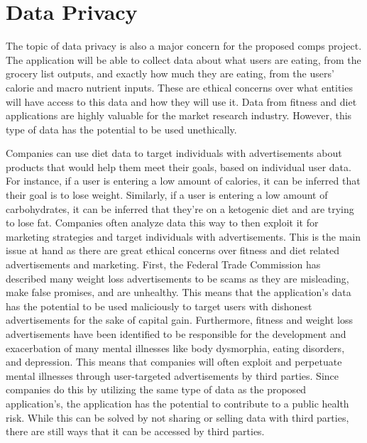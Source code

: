 \documentclass[10pt,twocolumn]{article}
\begin{document}
\section{Data Privacy}
The topic of data privacy is also a major concern for the proposed comps project. The application will be able to collect data about what users are eating, from the grocery list outputs, and exactly how much they are eating, from the users’ calorie and macro nutrient inputs. These are ethical concerns over what entities will have access to this data and how they will use it. Data from fitness and diet applications are highly valuable for the market research industry. However, this type of data has the potential to be used unethically. 

Companies can use diet data to target individuals with advertisements about products that would help them meet their goals, based on individual user data. For instance, if a user is entering a low amount of calories, it can be inferred that their goal is to lose weight. Similarly, if a user is entering a low amount of carbohydrates, it can be inferred that they’re on a ketogenic diet and are trying to lose fat. Companies often analyze data this way to then exploit it for marketing strategies and target individuals with advertisements.\cite{privacy_international_2021} This is the main issue at hand as there are great ethical concerns over fitness and diet related advertisements and marketing. First, the Federal Trade Commission has described many weight loss advertisements to be scams as they are misleading, make false promises, and are unhealthy.\cite{hebert_hernandez_perkins_puig_2022} This means that the application’s data has the potential to be used maliciously to target users with dishonest advertisements for the sake of capital gain. Furthermore, fitness and weight loss advertisements have been identified to be responsible for the development and exacerbation of many mental illnesses like body dysmorphia, eating disorders, and depression.\cite{shukla_2017} This means that companies will often exploit and perpetuate mental illnesses through user-targeted advertisements by third parties. Since companies do this by utilizing the same type of data as the proposed application’s, the application has the potential to contribute to a public health risk. While this can be solved by not sharing or selling data with third parties, there are still ways that it can be accessed by third parties.
\end{document}
